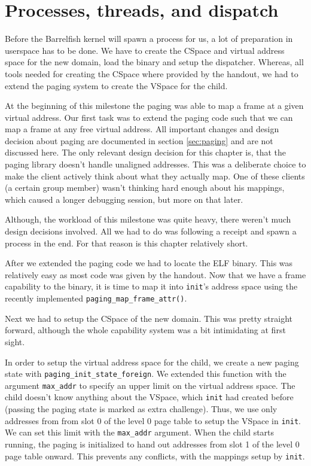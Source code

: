 \chapter{Processes, threads, and dispatch}

Before the Barrelfish kernel will spawn a process for us, a lot of preparation in userspace
has to be done. We have to create the CSpace and virtual address space for the new domain, load
the binary and setup the dispatcher. Whereas, all tools needed for creating the CSpace where provided
by the handout, we had to extend the paging system to create the VSpace for the child. 

At the beginning of this milestone the paging was able to map a frame at a given virtual address. 
Our first task was to extend the paging code such that we can map a frame at any free virtual address.
All important changes and design decision about paging are documented in section \ref{sec:paging} and
are not discussed here. The only relevant design decision for this chapter is, that the paging library
doesn't handle unaligned addresses. This was a deliberate choice to make the client actively think about
what they actually map. One of these clients (a certain group member) wasn't thinking hard enough about
his mappings, which caused a longer debugging session, but more on that later.

Although, the workload of this milestone was quite heavy, there weren't much design decisions involved.
All we had to do was following a receipt and spawn a process in the end. For that reason is this chapter
relatively short.

After we extended the paging code we had to locate the ELF binary. This was relatively easy as most code
was given by the handout. Now that we have a frame capability to the binary, it is time to map it into
\verb|init|'s address space using the recently implemented \verb|paging_map_frame_attr()|.

Next we had to setup the CSpace of the new domain. This was pretty straight forward, although the whole
capability system was a bit intimidating at first sight.

In order to setup the virtual address space for the child, we create a new paging state with 
\verb|paging_init_state_foreign|. We extended this function with the argument \verb|max_addr| to specify
an upper limit on the virtual address space. The child doesn't know anything about the VSpace, which
\verb|init| had created before (passing the paging state is marked as extra challenge). Thus, we use
only addresses from from slot 0 of the level 0 page table to setup the VSpace in \verb|init|. We can set
this limit with the \verb|max_addr| argument. When the child starts running, the paging is initialized to
hand out addresses from slot 1 of the level 0 page table onward. This prevents any conflicts, with the 
mappings setup by \verb|init|.

